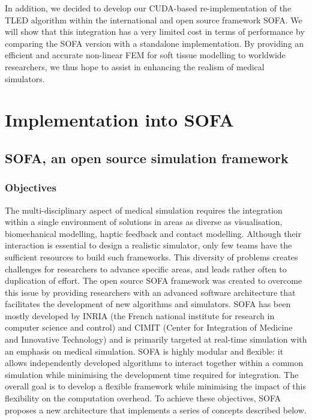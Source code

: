 In addition, we decided to develop our CUDA-based re-implementation of the TLED algorithm within the international and open source framework SOFA. We will show that this integration has a very limited cost in terms of performance by comparing the SOFA version with a standalone implementation. By providing an efficient and accurate non-linear FEM for soft tissue modelling to worldwide researchers, we thus hope to assist in enhancing the realism of medical simulators.
	
	
\section{Implementation into SOFA}

	\subsection{SOFA, an open source simulation framework}

\subsubsection*{Objectives}
The multi-disciplinary aspect of medical simulation requires the integration within a single environment of solutions in areas as diverse as visualisation, biomechanical modelling, haptic feedback and contact modelling. Although their interaction is essential to design a realistic simulator, only few teams have the sufficient resources to build such frameworks. This diversity of problems creates challenges for researchers to advance specific areas, and leads rather often to duplication of effort. The open source SOFA framework \citep{Allard07} was created to overcome this issue by providing researchers with an advanced software architecture that facilitates the development of new algorithms and simulators. SOFA has been mostly developed by INRIA (the French national institute for research in computer science and control) and CIMIT (Center for Integration of Medicine and Innovative Technology) and is primarily targeted at real-time simulation with an emphasis on medical simulation. SOFA is highly modular and flexible: it allows independently developed algorithms to interact together within a common simulation while minimising the development time required for integration. The overall goal is to develop a flexible framework while minimising the impact of this flexibility on the computation overhead. To achieve these objectives, SOFA proposes a new architecture that implements a series of concepts described below. 


